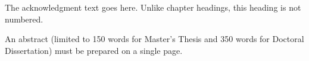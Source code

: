\documentclass{thesis}
\author{Sir Isaac Newton}   %
\begin{document}
 
\titlepage             %
\tableofcontents       %
\listoftables          %
\listoffigures         %

The acknowledgment text goes here. Unlike chapter headings, 
this heading is not numbered.

An abstract (limited to 150 words for Master’s Thesis and 350 words for Doctoral
Dissertation) must be prepared on a single page.








\begin{singlespace}
\printbibliography
\end{singlespace}

\appendix    %




\end{document}
